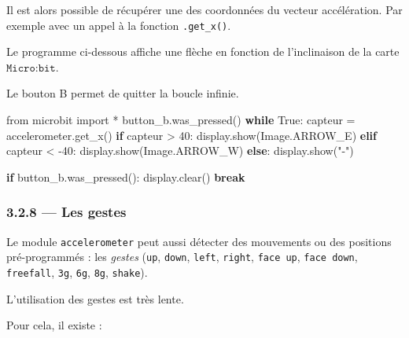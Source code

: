 \documentclass[a4paper,17pt]{extarticle}
\newenvironment{Shaded}{}{}
\newcommand{\DecValTok}[1]{\textcolor[rgb]{0.25,0.63,0.44}{{#1}}}
\newcommand{\StringTok}[1]{\textcolor[rgb]{0.25,0.44,0.63}{{#1}}}
\newcommand{\NormalTok}[1]{{#1}}
\newcommand{\ImportTok}[1]{{#1}}
\newcommand{\VariableTok}[1]{\textcolor[rgb]{0.10,0.09,0.49}{{#1}}}
\newcommand{\ControlFlowTok}[1]{\textcolor[rgb]{0.00,0.44,0.13}{\textbf{{#1}}}}
\newcommand{\OperatorTok}[1]{\textcolor[rgb]{0.40,0.40,0.40}{{#1}}}
\begin{document}
Il est alors possible de récupérer une des coordonnées du vecteur
accélération. Par exemple avec un appel à la fonction
\texttt{.get\_x()}.
\begin{exemple}
    Le programme ci-dessous affiche une flèche en fonction de l'inclinaison
de la carte \(\texttt{Micro:bit}\).

Le bouton B permet de quitter la boucle infinie.

\begin{Shaded}
\begin{Highlighting}[]
\ImportTok{from}\NormalTok{ microbit }\ImportTok{import} \OperatorTok{*}
\NormalTok{button\_b.was\_pressed()}
\ControlFlowTok{while} \VariableTok{True}\NormalTok{:}
\NormalTok{    capteur }\OperatorTok{=}\NormalTok{ accelerometer.get\_x()}
    \ControlFlowTok{if}\NormalTok{ capteur }\OperatorTok{\textgreater{}} \DecValTok{40}\NormalTok{:}
\NormalTok{        display.show(Image.ARROW\_E)}
    \ControlFlowTok{elif}\NormalTok{ capteur }\OperatorTok{\textless{}} \OperatorTok{{-}}\DecValTok{40}\NormalTok{:}
\NormalTok{        display.show(Image.ARROW\_W)}
    \ControlFlowTok{else}\NormalTok{:}
\NormalTok{        display.show(}\StringTok{"{-}"}\NormalTok{)}
        
    \ControlFlowTok{if}\NormalTok{ button\_b.was\_pressed():}
\NormalTok{        display.clear()}
        \ControlFlowTok{break}
\end{Highlighting}
\end{Shaded}

        \end{exemple}
    \hypertarget{les-gestes}{%
\subsubsection{3.2.8 --- Les gestes}\label{les-gestes}}

Le module \texttt{accelerometer} peut aussi détecter des mouvements ou
des positions pré-programmés : les \emph{gestes}
(\texttt{\textquotesingle{}up\textquotesingle{}},
\texttt{\textquotesingle{}down\textquotesingle{}},
\texttt{\textquotesingle{}left\textquotesingle{}},
\texttt{\textquotesingle{}right\textquotesingle{}},
\texttt{\textquotesingle{}face\ up\textquotesingle{}},
\texttt{\textquotesingle{}face\ down\textquotesingle{}},
\texttt{\textquotesingle{}freefall\textquotesingle{}},
\texttt{\textquotesingle{}3g\textquotesingle{}},
\texttt{\textquotesingle{}6g\textquotesingle{}},
\texttt{\textquotesingle{}8g\textquotesingle{}},
\texttt{\textquotesingle{}shake\textquotesingle{}}).
\begin{remarque}
    L'utilisation des gestes est très lente.

        \end{remarque}
    Pour cela, il existe :
\end{document}
